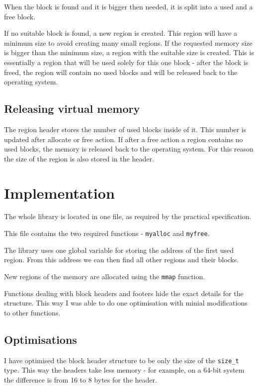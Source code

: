 \documentclass{article}
\begin{document}
When the block is found and it is bigger then needed, it is split into a used and a free block.

If no suitable block is found, a new region is created. This region will have a minimum size to avoid creating many small regions. If the requested memory size is bigger than the minimum size, a region with the suitable size is created. This is essentially a region that will be used solely for this one block - after the block is freed, the region will contain no used blocks and will be released back to the operating system.

\subsection{Releasing virtual memory}

The region header stores the number of used blocks inside of it. This number is updated after allocate or free action. If after a free action a region contains no used blocks, the memory is released back to the operating system. For this reason the size of the region is also stored in the header.

\section{Implementation}

The whole library is located in one file, as required by the practical specification.

This file contains the two required functions - \lstinline{myalloc} and \lstinline{myfree}.

The library uses one global variable for storing the address of the first used region. From this address we can then find all other regions and their blocks.

New regions of the memory are allocated using the \lstinline{mmap} function.

Functions dealing with block headers and footers hide the exact details for the structure. This way I was able to do one optimisation with minial modifications to other functions.

\subsection{Optimisations}

I have optimised the block header structure to be only the size of the \lstinline{size_t} type. This way the headers take less memory - for example, on a 64-bit system the difference is from 16 to 8 bytes for the header.
\end{document}
